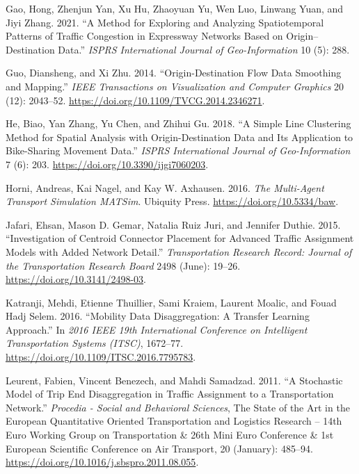\documentclass[
]{article}
\newlength{\cslhangindent}
\newlength{\cslentryspacingunit} %
\newenvironment{CSLReferences}[2] %
 {%
  \setlength{\parindent}{0pt}
  \ifodd #1
  \let\oldpar\par
  \def\par{\hangindent=\cslhangindent\oldpar}
  \fi
  \setlength{\parskip}{#2\cslentryspacingunit}
 }%
 {}
\begin{document}
\begin{CSLReferences}{1}{0}
\leavevmode{}%
Gao, Hong, Zhenjun Yan, Xu Hu, Zhaoyuan Yu, Wen Luo, Linwang Yuan, and Jiyi Zhang. 2021. {``A {Method} for {Exploring} and {Analyzing Spatiotemporal Patterns} of {Traffic Congestion} in {Expressway Networks Based} on {Origin}--{Destination Data}.''} \emph{ISPRS International Journal of Geo-Information} 10 (5): 288.

\leavevmode{}%
Guo, Diansheng, and Xi Zhu. 2014. {``Origin-{Destination Flow Data Smoothing} and {Mapping}.''} \emph{IEEE Transactions on Visualization and Computer Graphics} 20 (12): 2043--52. \url{https://doi.org/10.1109/TVCG.2014.2346271}.

\leavevmode{}%
He, Biao, Yan Zhang, Yu Chen, and Zhihui Gu. 2018. {``A {Simple Line Clustering Method} for {Spatial Analysis} with {Origin-Destination Data} and {Its Application} to {Bike-Sharing Movement Data}.''} \emph{ISPRS International Journal of Geo-Information} 7 (6): 203. \url{https://doi.org/10.3390/ijgi7060203}.

\leavevmode{}%
Horni, Andreas, Kai Nagel, and Kay W. Axhausen. 2016. \emph{The {Multi-Agent Transport Simulation MATSim}}. {Ubiquity Press}. \url{https://doi.org/10.5334/baw}.

\leavevmode{}%
Jafari, Ehsan, Mason D. Gemar, Natalia Ruiz Juri, and Jennifer Duthie. 2015. {``Investigation of {Centroid Connector Placement} for {Advanced Traffic Assignment Models} with {Added Network Detail}.''} \emph{Transportation Research Record: Journal of the Transportation Research Board} 2498 (June): 19--26. \url{https://doi.org/10.3141/2498-03}.

\leavevmode{}%
Katranji, Mehdi, Etienne Thuillier, Sami Kraiem, Laurent Moalic, and Fouad Hadj Selem. 2016. {``Mobility Data Disaggregation: {A} Transfer Learning Approach.''} In \emph{2016 {IEEE} 19th {International Conference} on {Intelligent Transportation Systems} ({ITSC})}, 1672--77. \url{https://doi.org/10.1109/ITSC.2016.7795783}.

\leavevmode{}%
Leurent, Fabien, Vincent Benezech, and Mahdi Samadzad. 2011. {``A Stochastic Model of Trip End Disaggregation in Traffic Assignment to a Transportation Network.''} \emph{Procedia - Social and Behavioral Sciences}, The {State} of the {Art} in the {European Quantitative Oriented Transportation} and {Logistics Research} -- 14th {Euro Working Group} on {Transportation} \& 26th {Mini Euro Conference} \& 1st {European Scientific Conference} on {Air Transport}, 20 (January): 485--94. \url{https://doi.org/10.1016/j.sbspro.2011.08.055}.


\end{CSLReferences}
\end{document}
